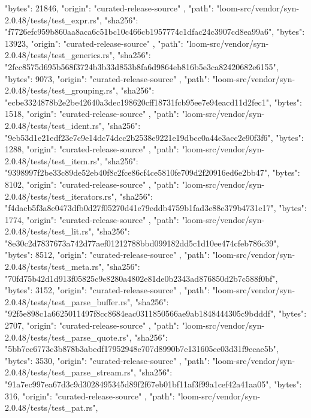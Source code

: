 {{      "bytes": 21846,
      "origin": "curated-release-source"
    },
    {
      "path": "loom-src/vendor/syn-2.0.48/tests/test_expr.rs",
      "sha256": "f7726efc959b860aa8aca6c51bc10c466cb1957774c1dfac24c3907cd8ea99a6",
      "bytes": 13923,
      "origin": "curated-release-source"
    },
    {
      "path": "loom-src/vendor/syn-2.0.48/tests/test_generics.rs",
      "sha256": "2fcc8575d695b568f3724b3b33d853b8fa6d9864eb816b5e3ca82420682e6155",
      "bytes": 9073,
      "origin": "curated-release-source"
    },
    {
      "path": "loom-src/vendor/syn-2.0.48/tests/test_grouping.rs",
      "sha256": "ecbe3324878b2e2be42640a3dec198620cff18731fcb95ee7e94eacd11d2fec1",
      "bytes": 1518,
      "origin": "curated-release-source"
    },
    {
      "path": "loom-src/vendor/syn-2.0.48/tests/test_ident.rs",
      "sha256": "9eb53d1e21edf23e7c9e14dc74dcc2b2538e9221e19dbcc0a44e3acc2e90f3f6",
      "bytes": 1288,
      "origin": "curated-release-source"
    },
    {
      "path": "loom-src/vendor/syn-2.0.48/tests/test_item.rs",
      "sha256": "9398997f2be33c89de52eb40f8c2fce86cf4ce5810fe709d2f20916ed6e2bb47",
      "bytes": 8102,
      "origin": "curated-release-source"
    },
    {
      "path": "loom-src/vendor/syn-2.0.48/tests/test_iterators.rs",
      "sha256": "f4dacb5f3a8e0473dfb0d27f05270d41e79eddb4759b1fad3e88e379b4731e17",
      "bytes": 1774,
      "origin": "curated-release-source"
    },
    {
      "path": "loom-src/vendor/syn-2.0.48/tests/test_lit.rs",
      "sha256": "8e30c2d7837673a742d77aef01212788bbd099182dd5c1d10ee474cfeb786c39",
      "bytes": 8512,
      "origin": "curated-release-source"
    },
    {
      "path": "loom-src/vendor/syn-2.0.48/tests/test_meta.rs",
      "sha256": "70fd75b42d1d913f05825c9e8280a4802e81de0b2343ad876850d2b7c588f0bf",
      "bytes": 3152,
      "origin": "curated-release-source"
    },
    {
      "path": "loom-src/vendor/syn-2.0.48/tests/test_parse_buffer.rs",
      "sha256": "92f5e898c1a6625011497f8cc8684eac0311850566ae9ab1848444305c9bdddf",
      "bytes": 2707,
      "origin": "curated-release-source"
    },
    {
      "path": "loom-src/vendor/syn-2.0.48/tests/test_parse_quote.rs",
      "sha256": "5bb7ec6773c3b878b3abedf17952948e707d8990b7e131605ee03d31f9ecae5b",
      "bytes": 3530,
      "origin": "curated-release-source"
    },
    {
      "path": "loom-src/vendor/syn-2.0.48/tests/test_parse_stream.rs",
      "sha256": "91a7ec997ea67d3c9d3028495345d89f2f67eb01bf11af3f99a1cef42a41aa05",
      "bytes": 316,
      "origin": "curated-release-source"
    },
    {
      "path": "loom-src/vendor/syn-2.0.48/tests/test_pat.rs",
}}

